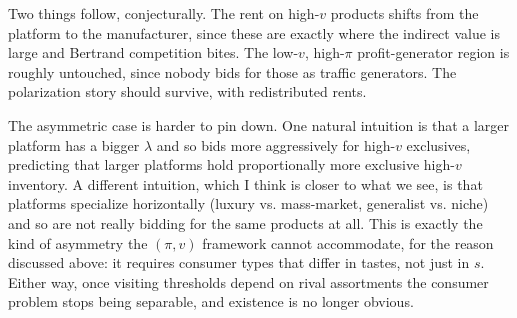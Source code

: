 \documentclass[11pt]{article}
\begin{document}
Two things follow, conjecturally. The rent on high-$v$ products shifts from the platform to the manufacturer, since these are exactly where the indirect value is large and Bertrand competition bites. The low-$v$, high-$\pi$ profit-generator region is roughly untouched, since nobody bids for those as traffic generators. The polarization story should survive, with redistributed rents.

The asymmetric case is harder to pin down. One natural intuition is that a larger platform has a bigger $\lambda$ and so bids more aggressively for high-$v$ exclusives, predicting that larger platforms hold proportionally more exclusive high-$v$ inventory. A different intuition, which I think is closer to what we see, is that platforms specialize horizontally (luxury vs. mass-market, generalist vs. niche) and so are not really bidding for the same products at all. This is exactly the kind of asymmetry the $(\pi,v)$ framework cannot accommodate, for the reason discussed above: it requires consumer types that differ in tastes, not just in $s$. Either way, once visiting thresholds depend on rival assortments the consumer problem stops being separable, and existence is no longer obvious.
\end{document}
